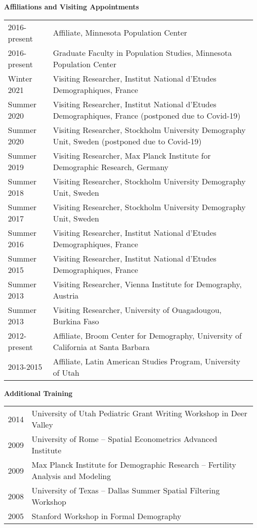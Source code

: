 \documentclass[11pt]{article} %
\begin{document}
\vspace{.5 cm}

\noindent
\textbf{Affiliations and Visiting Appointments}

\noindent
\begin{tabular}{lp{12cm}}
2016-present & Affiliate, Minnesota Population Center\\
2016-present& Graduate Faculty in Population Studies, Minnesota Population Center\\
Winter 2021 & Visiting Researcher, Institut National d'Etudes Demographiques, France\\
Summer 2020 & Visiting Researcher, Institut National d'Etudes Demographiques, France (postponed due to Covid-19)\\
Summer 2020 & Visiting Researcher, Stockholm University Demography Unit, Sweden (postponed due to Covid-19)\\ 
Summer 2019 & Visiting Researcher, Max Planck Institute for Demographic Research, Germany\\
Summer 2018 & Visiting Researcher, Stockholm University Demography Unit, Sweden\\ 
Summer 2017 & Visiting Researcher, Stockholm University Demography Unit, Sweden\\ 
Summer 2016 & Visiting Researcher, Institut National d'Etudes Demographiques, France\\
Summer 2015 & Visiting Researcher, Institut National d'Etudes Demographiques, France\\
Summer 2013 & Visiting Researcher, Vienna Institute for Demography, Austria\\
Summer 2013 & Visiting Researcher, University of Ouagadougou, Burkina Faso\\
2012-present & Affiliate, Broom Center for Demography, University of California at Santa Barbara \\
2013-2015 & Affiliate, Latin American Studies Program, University of Utah\\
\end{tabular}

\vspace{.5 cm}

\bigskip
\noindent
\textbf{Additional Training}


\noindent
\begin{tabular}{lp{12cm}}
2014 & University of Utah Pediatric Grant Writing Workshop in Deer Valley \\
2009 & University of Rome -- Spatial Econometrics Advanced Institute \\
2009 & Max Planck Institute for Demographic Research -- Fertility Analysis and Modeling \\
2008 & University of Texas -- Dallas Summer Spatial Filtering Workshop \\
2005 & Stanford Workshop in Formal Demography \\
\end{tabular}
\end{document}
